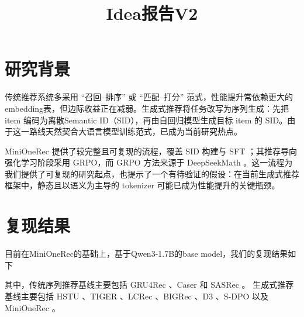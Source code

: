 \documentclass[11pt]{article}
\title{Idea报告V2}
\author{}
\date{}
\makeatletter
\renewcommand{\maketitle}{%
  \begin{center}
    {\LARGE \@title\par}
  \end{center}
  \vspace{-0.6\baselineskip}
}
\makeatother
\begin{document}
\maketitle

\section{研究背景}

传统推荐系统多采用 “召回–排序” 或 “匹配–打分” 范式，性能提升常依赖更大的 embedding表，但边际收益正在减弱。生成式推荐将任务改写为序列生成：先把 item 编码为离散Semantic ID（SID），再由自回归模型生成目标 item 的 SID。由于这一路线天然契合大语言模型训练范式，已成为当前研究热点。

MiniOneRec 提供了较完整且可复现的流程，覆盖 SID 构建与 SFT \cite{kong2025minionerec}；其推荐导向强化学习阶段采用 GRPO，而 GRPO 方法来源于 DeepSeekMath \cite{shao2024deepseekmath}。这一流程为我们提供了可复现的研究起点，也提示了一个有待验证的假设：在当前生成式推荐框架中，静态且以语义为主导的 tokenizer 可能已成为性能提升的关键瓶颈。

\section{复现结果}

目前在MiniOneRec的基础上，基于Qwen3-1.7B的base model，我们的复现结果如下

其中，传统序列推荐基线主要包括 GRU4Rec \cite{hidasi2016gru4rec}、Caser \cite{tang2018caser} 和 SASRec \cite{kang2018sasrec}。
生成式推荐基线主要包括 HSTU \cite{zhai2024hstu}、TIGER \cite{rajput2023tiger}、LCRec \cite{zheng2023lcrec}、BIGRec \cite{bao2023bigrec}、D3 \cite{bao2024d3}、S-DPO \cite{chen2024sdpo} 以及 MiniOneRec \cite{kong2025minionerec}。
\end{document}

